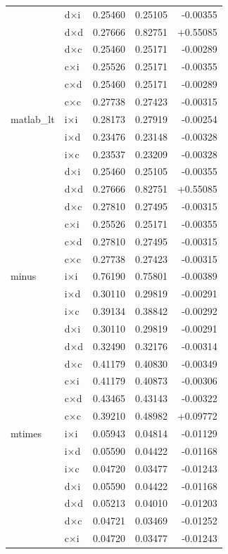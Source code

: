 \begin{longtable}{l l r r r}
   & d×i & 0.25460 & 0.25105 & -0.00355 \\
   & d×d & 0.27666 & 0.82751 & +0.55085 \\
   & d×c & 0.25460 & 0.25171 & -0.00289 \\
   & c×i & 0.25526 & 0.25171 & -0.00355 \\
   & c×d & 0.25460 & 0.25171 & -0.00289 \\
   & c×c & 0.27738 & 0.27423 & -0.00315 \\
\midrule
  matlab\_lt & i×i & 0.28173 & 0.27919 & -0.00254 \\
   & i×d & 0.23476 & 0.23148 & -0.00328 \\
   & i×c & 0.23537 & 0.23209 & -0.00328 \\
   & d×i & 0.25460 & 0.25105 & -0.00355 \\
   & d×d & 0.27666 & 0.82751 & +0.55085 \\
   & d×c & 0.27810 & 0.27495 & -0.00315 \\
   & c×i & 0.25526 & 0.25171 & -0.00355 \\
   & c×d & 0.27810 & 0.27495 & -0.00315 \\
   & c×c & 0.27738 & 0.27423 & -0.00315 \\
\midrule
  minus & i×i & 0.76190 & 0.75801 & -0.00389 \\
   & i×d & 0.30110 & 0.29819 & -0.00291 \\
   & i×c & 0.39134 & 0.38842 & -0.00292 \\
   & d×i & 0.30110 & 0.29819 & -0.00291 \\
   & d×d & 0.32490 & 0.32176 & -0.00314 \\
   & d×c & 0.41179 & 0.40830 & -0.00349 \\
   & c×i & 0.41179 & 0.40873 & -0.00306 \\
   & c×d & 0.43465 & 0.43143 & -0.00322 \\
   & c×c & 0.39210 & 0.48982 & +0.09772 \\
\midrule
  mtimes & i×i & 0.05943 & 0.04814 & -0.01129 \\
   & i×d & 0.05590 & 0.04422 & -0.01168 \\
   & i×c & 0.04720 & 0.03477 & -0.01243 \\
   & d×i & 0.05590 & 0.04422 & -0.01168 \\
   & d×d & 0.05213 & 0.04010 & -0.01203 \\
   & d×c & 0.04721 & 0.03469 & -0.01252 \\
   & c×i & 0.04720 & 0.03477 & -0.01243 \\

\end{longtable}
